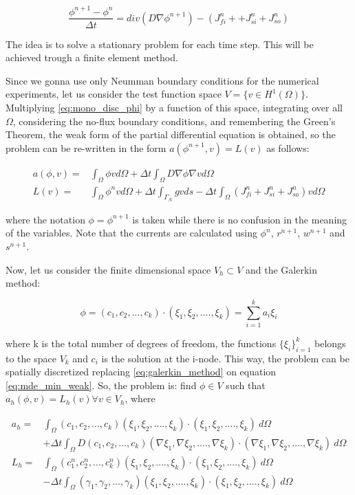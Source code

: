 \begin{equation}
\dfrac{\phi^{n + 1} - \phi^n}{\Delta t}=  div(D \nabla \phi^{n+1}) - (J_{fi}^n + +  J_{si}^n + J_{so}^n) \label{eq:mono_disc_phi}
\end{equation}

The idea is to solve a stationary problem for each time step. This will be achieved trough a finite element method. 

Since we gonna use only Neumman boundary conditions for the numerical experiments, let us consider the test function space $V = \{ v \in H^1(\Omega) \}$. Multiplying \eqref{eq:mono_disc_phi} by a function of this space, integrating over all $\Omega$, considering the no-flux boundary conditions, and remembering the Green's Theorem, the weak form of the partial differential equation is obtained, so the problem can be re-written in the form $a (\phi^{n+1}, v) = L (v)$ as follows:

\begin{align}
a (\phi, v) = & \int_{\Omega} \phi v  d \Omega + \Delta t \int_{\Omega} D \nabla \phi \nabla v d \Omega \\
L (v) = & \int_{\Omega} \phi^n v d \Omega + \Delta t \int_{\Gamma_N} g v ds - \Delta t \int_{\Omega}( J_{fi}^n +  J_{si}^n + J_{so}^n )v d \Omega \label{eq:mde_min_weak}
\end{align}

where the notation $\phi = \phi^{n+1}$ is taken while there is no confusion in the meaning of the variables. Note that the currents are calculated using $\phi^n$, $r^{n+1}$, $w^{n+1}$ and $s^{n+1}$. 

Now, let us consider the finite dimensional space $V_h \subset V$ and the Galerkin method:

\begin{equation}
\phi = (c_1, c_2, ..., c_k) \cdot (\xi_1, \xi_2, ...., \xi_k) = \sum_{i=1}^k a_i \xi_i \label{eq:galerkin_method}
\end{equation}

where k is the total number of degrees of freedom, the functions $\{\xi_i \}_{i=1}^k$ belongs to the space $V_k$ and $c_i$ is the solution at the i-node. This way, the problem can be spatially discretized replacing \eqref{eq:galerkin_method} on equation \eqref{eq:mde_min_weak}. So, the problem is: find $\phi\in V$ such that $a_h (\phi, v) = L_h(v) \forall v\in V_h$, where 

\begin{align*}
a_h = & \int_{\Omega} (c_1, c_2, ..., c_k) (\xi_1, \xi_2, ...., \xi_k) \cdot (\xi_1, \xi_2, ...., \xi_k) ~ d \Omega \\
& + \Delta t \int_{\Omega} D (c_1, c_2, ..., c_k) (\nabla \xi_1, \nabla \xi_2, ...., \nabla \xi_k) \cdot (\nabla \xi_1, \nabla \xi_2, ...., \nabla \xi_k)~ d \Omega \\
L_h = & \int_{\Omega} (c_1^n, c_2^n, ..., c_k^n) (\xi_1, \xi_2, ...., \xi_k) \cdot (\xi_1, \xi_2, ...., \xi_k)~ d \Omega \\
& - \Delta t \int_{\Omega} (\gamma_1, \gamma_2, ..., \gamma_k) (\xi_1, \xi_2, ...., \xi_k) \cdot (\xi_1, \xi_2, ...., \xi_k)~ d \Omega
\end{align*}



